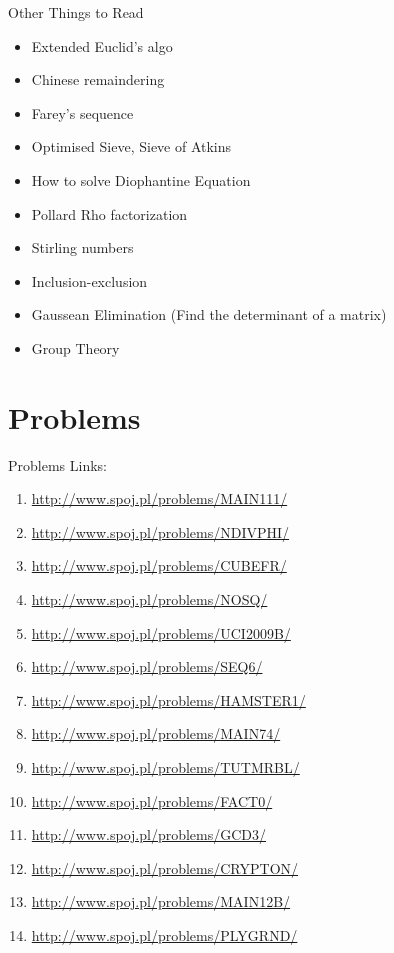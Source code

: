 \documentclass{beamer}
\begin{document}
\begin{frame}[<+->]{Other Things to Read}
  \begin{block}{}
    \begin{itemize}
      \item Extended Euclid's algo
      \item Chinese remaindering
      \item Farey's sequence
      \item Optimised Sieve, Sieve of Atkins
      \item How to solve Diophantine Equation
      \item Pollard Rho factorization
      \item Stirling numbers
      \item Inclusion-exclusion
      \item Gaussean Elimination (Find the determinant of a matrix)
      \item Group Theory
    \end{itemize}
\end{block}
\end{frame}

\section{Problems}

\begin{frame}{Problems}
Links:
\begin{enumerate}
\item \url{http://www.spoj.pl/problems/MAIN111/}
\item \url{http://www.spoj.pl/problems/NDIVPHI/}
\item \url{http://www.spoj.pl/problems/CUBEFR/}
\item \url{http://www.spoj.pl/problems/NOSQ/}
\item \url{http://www.spoj.pl/problems/UCI2009B/}
\item \url{http://www.spoj.pl/problems/SEQ6/}
\item \url{http://www.spoj.pl/problems/HAMSTER1/}
\item \url{http://www.spoj.pl/problems/MAIN74/}
\item \url{http://www.spoj.pl/problems/TUTMRBL/}
\item \url{http://www.spoj.pl/problems/FACT0/}
\item \url{http://www.spoj.pl/problems/GCD3/}
\item \url{http://www.spoj.pl/problems/CRYPTON/}
\item \url{http://www.spoj.pl/problems/MAIN12B/}
\item \url{http://www.spoj.pl/problems/PLYGRND/}
\end{enumerate}
\end{frame}
\end{document}
